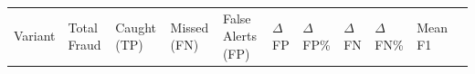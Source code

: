 \documentclass[
  11pt,
]{article}
\newcounter{none} %
\begin{document}
{\def\LTcaptype{none} %
\begin{longtable}[]{@{}
  >{\raggedright\arraybackslash}p{}
  >{\raggedright\arraybackslash}p{}
  >{\raggedright\arraybackslash}p{}
  >{\raggedright\arraybackslash}p{}
  >{\raggedright\arraybackslash}p{}
  >{\raggedright\arraybackslash}p{}
  >{\raggedright\arraybackslash}p{}
  >{\raggedright\arraybackslash}p{}
  >{\raggedright\arraybackslash}p{}
  >{\raggedright\arraybackslash}p{}
  >{\raggedright\arraybackslash}p{}@{}}
\toprule\noalign{}
\begin{minipage}[b]{\linewidth}\raggedright
Variant
\end{minipage} & \begin{minipage}[b]{\linewidth}\raggedright
Total Fraud
\end{minipage} & \begin{minipage}[b]{\linewidth}\raggedright
Caught (TP)
\end{minipage} & \begin{minipage}[b]{\linewidth}\raggedright
Missed (FN)
\end{minipage} & \begin{minipage}[b]{\linewidth}\raggedright
False Alerts (FP)
\end{minipage} & \begin{minipage}[b]{\linewidth}\raggedright
\(\Delta\)FP
\end{minipage} & \begin{minipage}[b]{\linewidth}\raggedright
\(\Delta\)FP\%
\end{minipage} & \begin{minipage}[b]{\linewidth}\raggedright
\(\Delta\)FN
\end{minipage} & \begin{minipage}[b]{\linewidth}\raggedright
\(\Delta\)FN\%
\end{minipage} & \begin{minipage}[b]{\linewidth}\raggedright
Mean F1
\end{minipage} & \begin{minipage}[b]{\linewidth}\raggedright

\end{minipage}
\end{longtable}}
\end{document}
